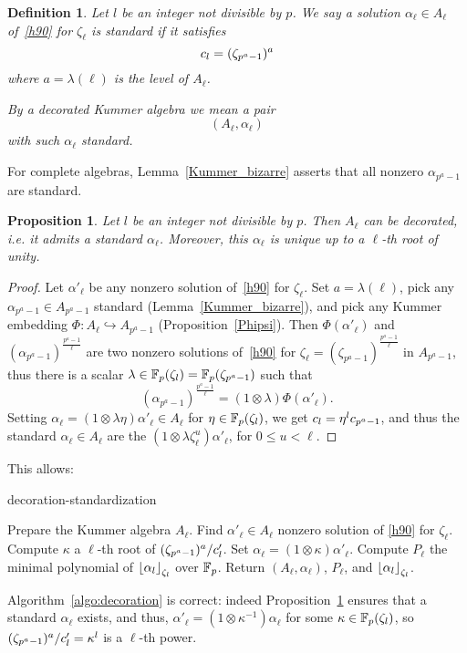 \documentclass{sig-alternate}
\newtheorem{proposition}[theorem]{Proposition}
\newtheorem{definition}[theorem]{Definition}
\begin{document}
\begin{definition}
\label{alphastandard}
Let $l$ be an integer not divisible by $p$.
We say a solution $\alpha_\ell\in A_\ell$ of~\eqref{h90} for $\zeta_\ell$ is \emph{standard}
if it satisfies
\[ c_{l}=(\zeta_{p^a-1})^a \]
where $a=\lambda(\ell)$ is the level of $A_\ell$.

By a \emph{decorated} Kummer algebra we mean a pair
\[ (A_\ell,\alpha_{\ell}) \]
with such $\alpha_\ell$ standard.
\end{definition}
For complete algebras, Lemma~\ref{Kummer_bizarre} asserts that all nonzero $\alpha_{p^a-1}$ are standard.
\begin{proposition}
\label{standardexiste}
Let $l$ be an integer not divisible by $p$.
Then $A_\ell$ can be decorated, i.e. it admits a standard $\alpha_\ell$.
Moreover, this $\alpha_\ell$ is unique up to a $\ell$-th root of unity.
\end{proposition}
\begin{proof}
Let $\alpha'_\ell$ be any nonzero solution of~\eqref{h90} for $\zeta_\ell$.
Set $a=\lambda(\ell)$, pick any $\alpha_{p^a-1}\in A_{p^a-1}$ standard (Lemma~\ref{Kummer_bizarre}),
and pick any Kummer embedding $\Phi:A_\ell\hookrightarrow A_{p^a-1}$ (Proposition~\ref{Phipsi}).
Then $\Phi(\alpha'_\ell)$ and $(\alpha_{p^a-1})^{\frac{p^a-1}{\ell}}$ are two nonzero solutions of~\eqref{h90}
for $\zeta_\ell=(\zeta_{p^a-1})^{\frac{p^a-1}{\ell}}$ in $A_{p^a-1}$, thus there is a scalar $\lambda\in\mathbb{F}_{p}(\zeta_l)=\mathbb{F}_{p}(\zeta_{p^a-1})$
such that \[(\alpha_{p^a-1})^{\frac{p^a-1}{\ell}}=(1\otimes\lambda)\Phi(\alpha'_\ell).\]
Setting $\alpha_\ell=(1\otimes\lambda\eta)\alpha'_\ell\in A_\ell$ for $\eta\in\mathbb{F}_{p}(\zeta_l)$,
we get $c_l=\eta^lc_{p^a-1}$, and
thus the standard $\alpha_\ell\in A_\ell$ are the $(1\otimes\lambda\zeta_\ell^u)\alpha'_\ell$, for $0\leq u<\ell$.
\end{proof}
This allows:
\begin{algorithm}
  \caption{decoration-standardization}
  \label{algo:decoration}
  \begin{algorithmic}[1]
  \STATE Prepare the Kummer algebra $A_\ell$.
  \STATE Find $\alpha'_\ell\in A_\ell$ nonzero solution of \eqref{h90} for $\zeta_\ell$.
  \STATE Compute $\kappa$ a $\ell$-th root of $(\zeta_{p^a-1})^a/c'_l$.
  \STATE Set $\alpha_{\ell}=(1\otimes\kappa)\alpha'_\ell$.
  \STATE Compute $P_\ell$ the minimal polynomial of $\left\lfloor \alpha_{l} \right\rfloor_{\zeta_l}$ over $\mathbb{F}_{p}$.
  \STATE Return $(A_\ell,\alpha_\ell)$, $P_\ell$, and $\left\lfloor \alpha_l \right\rfloor_{\zeta_l}$.
  \end{algorithmic}
\end{algorithm}
Algorithm~\ref{algo:decoration} is correct: indeed Proposition~\ref{standardexiste} ensures that
a standard $\alpha_{\ell}$ exists, and thus, $\alpha'_\ell=(1\otimes\kappa^{-1})\alpha_{\ell}$
for some $\kappa\in\mathbb{F}_{p}(\zeta_l)$, so $(\zeta_{p^a-1})^a/c'_l=\kappa^l$ is a $\ell$-th power.
\end{document}
